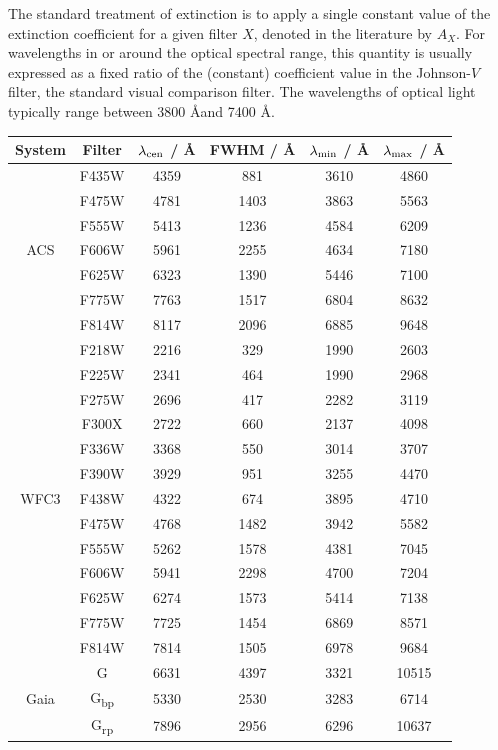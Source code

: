 \documentclass[12pt, a4paper]{report}
\begin{document}
The standard treatment of extinction is to apply a single constant value of the extinction coefficient for a given filter $X$, denoted in the literature by $A_{X}$. For wavelengths in or around the optical spectral range, this quantity is usually expressed as a fixed ratio of the (constant) coefficient value in the Johnson-$V$ filter, the standard visual comparison filter. The wavelengths of optical light typically range between 3800 \AA and 7400 \AA.

\begin{table}
\begin{center}
\begin{tabular}{cccccc}
\hline
System & Filter & $\lambda_{\textnormal{cen}}$ / \AA & FWHM / \AA & $\lambda_{\textnormal{min}}$ / \AA & $\lambda_{\textnormal{max}}$ / \AA \\
\hline
& F435W & 4359 & 881 & 3610 & 4860 \\ %
& F475W & 4781 & 1403 & 3863 & 5563 \\ %
& F555W & 5413 & 1236 & 4584 & 6209 \\ %
ACS & F606W & 5961 & 2255 & 4634 & 7180 \\ %
& F625W & 6323 & 1390 & 5446 & 7100 \\ %
& F775W & 7763 & 1517 & 6804 & 8632 \\ %
& F814W & 8117 & 2096 & 6885 & 9648 \\ %
\hline
& F218W & 2216 & 329 & 1990 & 2603 \\ %
& F225W & 2341 & 464 & 1990 & 2968 \\ %
& F275W & 2696 & 417 & 2282 & 3119 \\ %
& F300X & 2722 & 660 & 2137 & 4098 \\ %
& F336W & 3368 & 550 & 3014 & 3707 \\ %
& F390W & 3929 & 951 & 3255 & 4470 \\ %
WFC3 & F438W & 4322 & 674 & 3895 & 4710 \\ %
& F475W & 4768 & 1482 & 3942 & 5582 \\ %
& F555W & 5262 & 1578 & 4381 & 7045 \\ %
& F606W & 5941 & 2298 & 4700 & 7204 \\ %
& F625W & 6274 & 1573 & 5414 & 7138 \\ %
& F775W & 7725 & 1454 & 6869 & 8571 \\ %
& F814W & 7814 & 1505 & 6978 & 9684 \\ %
\hline
& G & 6631 & 4397 & 3321 & 10515 \\ %
Gaia & G\textsubscript{bp} & 5330 & 2530 & 3283 & 6714 \\ %
& G\textsubscript{rp} & 7896 & 2956 & 6296 & 10637 \\ %
\hline


\end{tabular}
\end{center}
\end{table}
\end{document}
